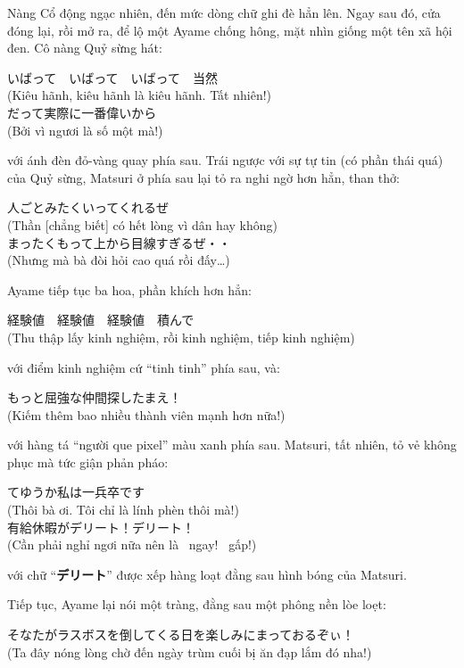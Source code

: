 \documentclass[../main.tex]{subfiles}
\begin{document}
Nàng Cổ động ngạc nhiên, đến mức dòng chữ ghi đè hẳn lên. Ngay sau đó, cửa đóng lại, rồi mở ra, để lộ một Ayame chống hông, mặt nhìn giống một tên xã hội đen. Cô nàng Quỷ sừng hát:

\begin{center}
  いばって　いばって　いばって　当然 \\ (Kiêu hãnh, kiêu hãnh là kiêu hãnh. Tất nhiên!) \\
  だって実際に一番偉いから \\ (Bởi vì ngươi là số một mà!)
\end{center}

với ánh đèn đỏ-vàng quay phía sau. Trái ngược với sự tự tin (có phần thái quá) của Quỷ sừng, Matsuri ở phía sau lại tỏ ra nghi ngờ hơn hẳn, than thở:
\begin{center}
  人ごとみたくいってくれるぜ \\ (Thần [chẳng biết] có hết lòng vì dân hay không) \\
  まったくもって上から目線すぎるぜ・・ \\ (Nhưng mà bà đòi hỏi cao quá rồi đấy\dots)
\end{center}

Ayame tiếp tục ba hoa, phần khích hơn hẳn:
\begin{center}
  経験値　経験値　経験値　積んで \\ (Thu thập lấy kinh nghiệm, rồi kinh nghiệm, tiếp kinh nghiệm)
\end{center}

với điểm kinh nghiệm cứ ``tinh tinh'' phía sau, và:
\begin{center}
  もっと屈強な仲間探したまえ！ \\ (Kiếm thêm bao nhiều thành viên mạnh hơn nữa!)
\end{center}

với hàng tá ``người que pixel'' màu xanh phía sau. Matsuri, tất nhiên, tỏ vẻ không phục mà tức giận phản pháo:
\begin{center}
  てゆうか私は一兵卒です \\ (Thôi bà ơi. Tôi chỉ là lính phèn thôi mà!) \\
  有給休暇がデリート！デリート！ \\ (Cần phải nghỉ ngơi nữa nên là \ ngay! \ gấp!)
\end{center}

với chữ ``\textbf{デリート}'' được xếp hàng loạt đằng sau hình bóng của Matsuri.

Tiếp tục, Ayame lại nói một tràng, đằng sau một phông nền lòe loẹt:
\begin{center}
  そなたがラスボスを倒してくる日を楽しみにまっておるぞぃ！ \\ (Ta đây nóng lòng chờ đến ngày trùm cuối bị ăn đạp lắm đó nha!)
\end{center}
\end{document}
